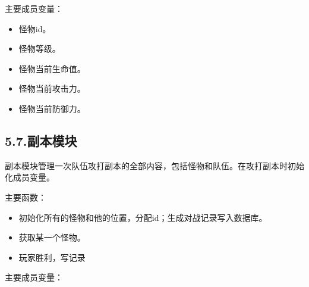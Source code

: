 \documentclass{article}
\begin{document}
\noindent{}主要成员变量：%

\begin{itemize}[noitemsep,topsep=\mdcompacttopsep]%

\item{}怪物id。%

\item{}怪物等级。%

\item{}怪物当前生命值。%

\item{}怪物当前攻击力。%

\item{}怪物当前防御力。%
\end{itemize}%

\subsection{5.7.\hspace*{0.5em}副本模块}\label{56}%

\noindent{}副本模块管理一次队伍攻打副本的全部内容，包括怪物和队伍。在攻打副本时初始化成员变量。%

主要函数：%

\begin{itemize}[noitemsep,topsep=\mdcompacttopsep]%

\item{}初始化所有的怪物和他的位置，分配id；生成对战记录写入数据库。%

\item{}获取某一个怪物。%

\item{}玩家胜利，写记录%
\end{itemize}%

\noindent{}主要成员变量：%
\end{document}
